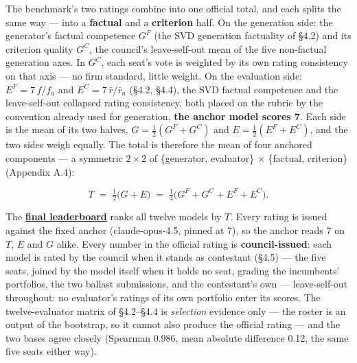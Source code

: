 The benchmark's two ratings combine into one official total, and each splits the same way --- into a \textbf{factual} and a \textbf{criterion} half. On the generation side: the generator's factual competence \(G^{F}\) (the SVD generation factuality of §4.2) and its criterion quality \(G^{C}\), the council's leave-self-out mean of the five non-factual generation axes. In \(G^{C}\), each seat's vote is weighted by its own rating consistency on that axis --- no firm standard, little weight. On the evaluation side: \(E^{F} = 7\,f/f_a\) and \(E^{C} = 7\,\bar r/\bar r_a\) (§4.2, §4.4), the SVD factual competence and the leave-self-out collapsed rating consistency, both placed on the rubric by the convention already used for generation, \textbf{the anchor model scores 7}. Each side is the mean of its two halves, \(G = \tfrac12(G^{F}+G^{C})\) and \(E = \tfrac12(E^{F}+E^{C})\), and the two sides weigh equally. The total is therefore the mean of four anchored components --- a symmetric \(2\times2\) of \{generator, evaluator\} \(\times\) \{factual, criterion\} (Appendix A.4):

\[T \;=\; \tfrac{1}{2}\big( G + E \big) \;=\; \tfrac{1}{4}\big( G^{F} + G^{C} + E^{F} + E^{C} \big). \tag{2}\]

The \textbf{\hyperref[tab-final-leaderboard]{final leaderboard}} ranks all twelve models by \(T\). Every rating is issued against the fixed anchor (claude-opus-4.5, pinned at 7), so the anchor reads 7 on \(T\), \(E\) and \(G\) alike. Every number in the official rating is \textbf{council-issued}: each model is rated by the council when it stands as contestant (§4.5) --- the five seats, joined by the model itself when it holds no seat, grading the incumbents' portfolios, the two ballast submissions, and the contestant's own --- leave-self-out throughout: no evaluator's ratings of its own portfolio enter its scores. The twelve-evaluator matrix of §4.2--§4.4 is \emph{selection} evidence only --- the roster is an output of the bootstrap, so it cannot also produce the official rating --- and the two bases agree closely (Spearman 0.986, mean absolute difference 0.12, the same five seats either way).

\protect{}\label{tab-final-leaderboard}{}

